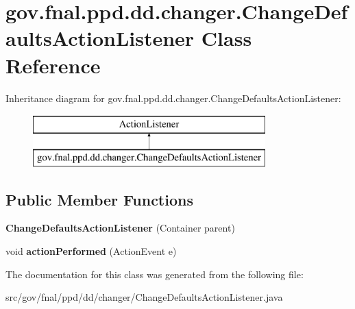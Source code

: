 \hypertarget{classgov_1_1fnal_1_1ppd_1_1dd_1_1changer_1_1ChangeDefaultsActionListener}{\section{gov.\-fnal.\-ppd.\-dd.\-changer.\-Change\-Defaults\-Action\-Listener Class Reference}
\label{classgov_1_1fnal_1_1ppd_1_1dd_1_1changer_1_1ChangeDefaultsActionListener}
}
Inheritance diagram for gov.\-fnal.\-ppd.\-dd.\-changer.\-Change\-Defaults\-Action\-Listener\-:\begin{figure}[H]
\begin{center}
\leavevmode
\includegraphics[height=2.000000cm]{classgov_1_1fnal_1_1ppd_1_1dd_1_1changer_1_1ChangeDefaultsActionListener}
\end{center}
\end{figure}
\subsection*{Public Member Functions}
\begin{DoxyCompactItemize}
\item 
\hypertarget{classgov_1_1fnal_1_1ppd_1_1dd_1_1changer_1_1ChangeDefaultsActionListener_a3b0b37ba3ebf3a0b878c7715b46c5c0c}{{\bfseries Change\-Defaults\-Action\-Listener} (Container parent)}\label{classgov_1_1fnal_1_1ppd_1_1dd_1_1changer_1_1ChangeDefaultsActionListener_a3b0b37ba3ebf3a0b878c7715b46c5c0c}

\item 
\hypertarget{classgov_1_1fnal_1_1ppd_1_1dd_1_1changer_1_1ChangeDefaultsActionListener_a29a64447afe74de6954ba633ee8775ec}{void {\bfseries action\-Performed} (Action\-Event e)}\label{classgov_1_1fnal_1_1ppd_1_1dd_1_1changer_1_1ChangeDefaultsActionListener_a29a64447afe74de6954ba633ee8775ec}

\end{DoxyCompactItemize}


The documentation for this class was generated from the following file\-:\begin{DoxyCompactItemize}
\item 
src/gov/fnal/ppd/dd/changer/Change\-Defaults\-Action\-Listener.\-java\end{DoxyCompactItemize}
